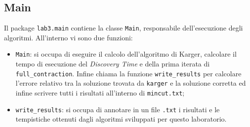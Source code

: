 \subsection{Main}
Il package \texttt{lab3.main} contiene la classe \texttt{Main}, responsabile dell'esecuzione degli algoritmi. All'interno vi sono due funzioni:
\begin{itemize}
	\item \texttt{Main}: si occupa di eseguire il calcolo dell'algoritmo di Karger, calcolare il tempo di esecuzione del \textit{Discovery Time} e della prima iterata di \texttt{full\_contraction}. Infine chiama la funzione \texttt{write\_results} per calcolare l'errore relativo tra la soluzione trovata da \texttt{karger} e la soluzione corretta ed infine scrivere tutti i risultati all'interno di \texttt{mincut.txt};
	\item \texttt{write\_results}: si occupa di annotare in un file \texttt{.txt} i risultati e le tempistiche ottenuti dagli algoritmi sviluppati per questo laboratorio.
\end{itemize}